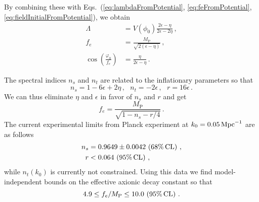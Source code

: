 \documentclass[11pt]{article}
\begin{document}
By combining these with Eqs.~(\ref{eq:lambdaFromPotential}, \ref{eq:feFromPotential}, \ref{eq:fieldInitialFromPotential}), we obtain
\begin{align} %
  \label{eq:lambdaSlowRoll}
  \Lambda &= V\left(\phi_0\right) \frac{2 \epsilon - \eta}{2 \epsilon - 2 \eta}\,,\\
  \label{eq:feSlowRoll}
  f_e &= \frac{M_\text{P}}{\sqrt{2 \left(\epsilon - \eta\right)}}\,,\\
  \label{eq:fieldInitialSlowRoll}
  \cos\left(\frac{\varphi_0}{f_e}\right) &= \frac{\eta}{2 \epsilon - \eta}\,.
\end{align}

The spectral indices $n_s$ and $n_t$ are related to the inflationary parameters so that
\begin{equation} \label{eq:observablesSlowRoll}
  n_s = 1 - 6 \epsilon + 2 \eta\,,
  ~~~ n_t = -2 \epsilon\,,
  ~~~ r = 16 \epsilon\,.
\end{equation}
We can thus eliminate $\eta$ and $\epsilon$ in favor of $n_s$ and $r$ and get
\begin{equation} \label{eq:feSpectralIndices}
  f_e = \frac{M_\text{P}}{\sqrt{1 - n_s - r / 4}}\,.
\end{equation}
The current experimental limits from Planck experiment at $k_0 = 0.05\,{\rm Mpc}^{-1}$ are as follows~\cite{Akrami:2018vks, Akrami:2018odb, Array:2015xqh}
\begin{equation} \label{data}
  \begin{aligned}
    n_s &= 0.9649 \pm 0.0042\, \left(68\%\, {\rm CL}\right)\,,\\
      r &< 0.064\, \left(95\%\, {\rm CL}\right)\,,
  \end{aligned}
\end{equation}
while $n_t\left(k_0\right)$ is currently not constrained.
Using this data we find model-independent bounds on the effective axionic decay constant so that
\begin{equation} \label{eq:feExperimentalConstraint}
  4.9 \leq f_e / M_\text{P} \leq 10.0\, \left(95\%\, {\rm CL}\right)\,.
\end{equation}
\end{document}
